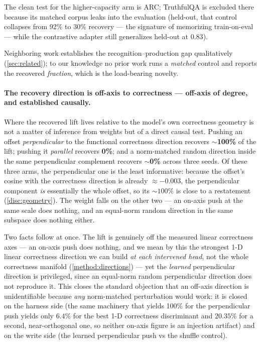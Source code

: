 The clean test for the higher-capacity arm is ARC; TruthfulQA is excluded there
because its matched corpus leaks into the evaluation (held-out, that control collapses
from 92\% to 30\% recovery --- the signature of memorizing train-on-eval --- while the
contrastive adapter still generalizes held-out at $0.83$).

Neighboring work establishes the recognition--production gap qualitatively
(\cref{sec:related}); to our knowledge no prior work runs a \emph{matched} control
and reports the recovered \emph{fraction}, which is the load-bearing novelty.

\paragraph{The recovery direction is off-axis to correctness --- off-axis of
degree, and established causally.}
Where the recovered lift lives relative to the model's own correctness geometry is
not a matter of inference from weights but of a direct causal test. Pushing an
offset \emph{perpendicular} to the functional correctness direction recovers
${\sim}$\textbf{100\%} of the lift; pushing it \emph{parallel} recovers
\textbf{0\%}; and a norm-matched random direction inside the same perpendicular
complement recovers ${\sim}$\textbf{0\%} across three seeds. Of these three arms,
the perpendicular one is the least informative: because the offset's cosine with the
correctness direction is already ${\approx}-0.003$, the perpendicular component
\emph{is} essentially the whole offset, so its ${\sim}100\%$ is close to a
restatement (\cref{disc:geometry}). The weight falls on the other two --- an on-axis
push at the same scale does nothing, and an equal-norm random direction in the same
subspace does nothing either.

Two facts follow at once. The lift is genuinely off the measured linear correctness
axes --- an on-axis push does nothing, and we mean by this the strongest 1-D linear
correctness direction we can build \emph{at each intervened head}, not the whole
correctness manifold (\cref{method:directions}) --- yet the \emph{learned} perpendicular direction is
privileged, since an equal-norm random perpendicular direction does not reproduce
it. This closes the standard objection that an off-axis direction is unidentifiable
because \emph{any} norm-matched perturbation would work: it is closed on the harness
side (the same machinery that yields 100\% for the perpendicular push yields only
$6.4\%$ for the best 1-D correctness discriminant and $20.35\%$ for a second,
near-orthogonal one, so neither on-axis figure is an injection artifact) and on the write side (the learned perpendicular push vs the shuffle
control).

